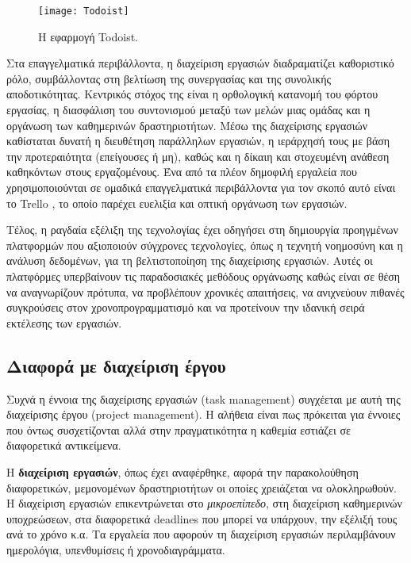             \begin{figure}[h!] \noindent \centering
                \texttt{[image: Todoist]}
                \caption{Η εφαρμογή Todoist.}
            \end{figure}

            Στα επαγγελματικά περιβάλλοντα, η διαχείριση εργασιών διαδραματίζει καθοριστικό ρόλο, συμβάλλοντας στη βελτίωση της συνεργασίας και της συνολικής αποδοτικότητας. Κεντρικός στόχος της είναι η ορθολογική κατανομή του φόρτου εργασίας, η διασφάλιση του συντονισμού μεταξύ των μελών μιας ομάδας και η οργάνωση των καθημερινών δραστηριοτήτων.  Μέσω της διαχείρισης εργασιών καθίσταται δυνατή η διευθέτηση παράλληλων εργασιών, η ιεράρχησή τους με βάση την προτεραιότητα (επείγουσες ή μη), καθώς και η δίκαιη και στοχευμένη ανάθεση καθηκόντων στους εργαζομένους. Ένα από τα πλέον δημοφιλή εργαλεία που χρησιμοποιούνται σε ομαδικά επαγγελματικά περιβάλλοντα για τον σκοπό αυτό είναι το Trello \cite{Trello}, το οποίο παρέχει ευελιξία και οπτική οργάνωση των εργασιών.

            Τέλος, η ραγδαία εξέλιξη της τεχνολογίας έχει οδηγήσει στη δημιουργία προηγμένων πλατφορμών που αξιοποιούν σύγχρονες τεχνολογίες, όπως η τεχνητή νοημοσύνη και η ανάλυση δεδομένων, για τη βελτιστοποίηση της διαχείρισης εργασιών. Αυτές οι πλατφόρμες υπερβαίνουν τις παραδοσιακές μεθόδους οργάνωσης καθώς είναι σε θέση να αναγνωρίζουν πρότυπα, να προβλέπουν χρονικές απαιτήσεις, να ανιχνεύουν πιθανές συγκρούσεις στον χρονοπρογραμματισμό και να προτείνουν την ιδανική σειρά εκτέλεσης των εργασιών.

        \subsection{Διαφορά με διαχείριση έργου}
            Συχνά η έννοια της διαχείρισης εργασιών (task management) συγχέεται με αυτή της διαχείρισης έργου (project management). Η αλήθεια είναι πως πρόκειται για έννοιες που όντως συσχετίζονται αλλά στην πραγματικότητα η καθεμία εστιάζει σε διαφορετικά αντικείμενα.

            Η \textbf{διαχείριση εργασιών}, όπως έχει αναφέρθηκε, αφορά την παρακολούθηση διαφορετικών, μεμονομένων δραστηριοτήτων οι οποίες χρειάζεται να ολοκληρωθούν. Η διαχείριση εργασιών επικεντρώνεται στο \textit{μικροεπίπεδο}, στη διαχείριση καθημερινών υποχρεώσεων, στα διαφορετικά deadlines που μπορεί να υπάρχουν, την εξέλιξή τους ανά το χρόνο κ.α. Τα εργαλεία που αφορούν τη διαχείριση εργασιών περιλαμβάνουν ημερολόγια, υπενθυμίσεις ή χρονοδιαγράμματα.

